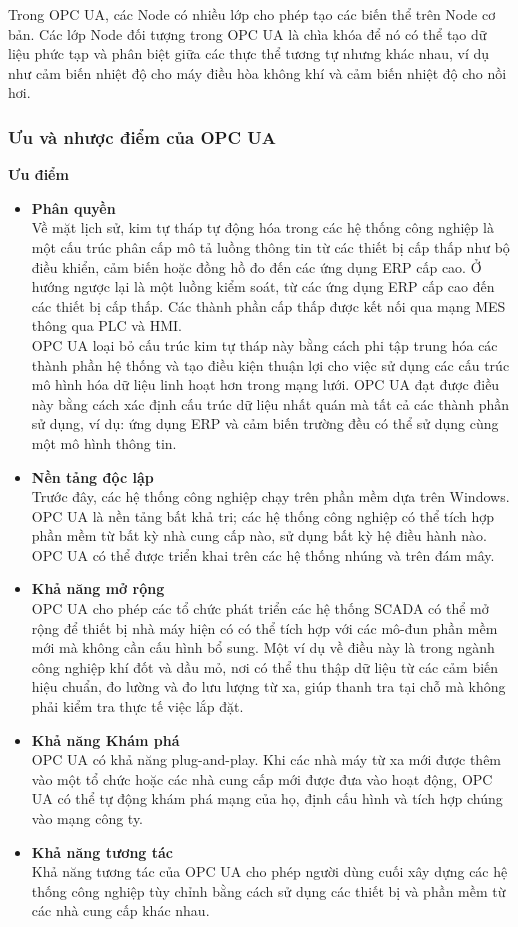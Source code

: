 Trong OPC UA, các Node có nhiều lớp cho phép tạo các biến thể trên Node cơ bản. Các lớp Node đối tượng trong OPC UA là chìa khóa để nó có thể tạo dữ liệu phức tạp và phân biệt giữa các thực thể tương tự nhưng khác nhau, ví dụ như cảm biến nhiệt độ cho máy điều hòa không khí và cảm biến nhiệt độ cho nồi hơi.

\subsubsection{Ưu và nhược điểm của OPC UA}

\textbf{Ưu điểm}

\begin{itemize}
    \item \textbf{Phân quyền}\\
    Về mặt lịch sử, kim tự tháp tự động hóa trong các hệ thống công nghiệp là một cấu trúc phân cấp mô tả luồng thông tin từ các thiết bị cấp thấp như bộ điều khiển, cảm biến hoặc đồng hồ đo đến các ứng dụng ERP cấp cao. Ở hướng ngược lại là một luồng kiểm soát, từ các ứng dụng ERP cấp cao đến các thiết bị cấp thấp. Các thành phần cấp thấp được kết nối qua mạng MES thông qua PLC và HMI.\\
    OPC UA loại bỏ cấu trúc kim tự tháp này bằng cách phi tập trung hóa các thành phần hệ thống và tạo điều kiện thuận lợi cho việc sử dụng các cấu trúc mô hình hóa dữ liệu linh hoạt hơn trong mạng lưới. OPC UA đạt được điều này bằng cách xác định cấu trúc dữ liệu nhất quán mà tất cả các thành phần sử dụng, ví dụ: ứng dụng ERP và cảm biến trường đều có thể sử dụng cùng một mô hình thông tin.
    \item \textbf{Nền tảng độc lập}\\
    Trước đây, các hệ thống công nghiệp chạy trên phần mềm dựa trên Windows. OPC UA là nền tảng bất khả tri; các hệ thống công nghiệp có thể tích hợp phần mềm từ bất kỳ nhà cung cấp nào, sử dụng bất kỳ hệ điều hành nào. OPC UA có thể được triển khai trên các hệ thống nhúng và trên đám mây.
    \item \textbf{Khả năng mở rộng}\\ 
    OPC UA cho phép các tổ chức phát triển các hệ thống SCADA có thể mở rộng để thiết bị nhà máy hiện có có thể tích hợp với các mô-đun phần mềm mới mà không cần cấu hình bổ sung. Một ví dụ về điều này là trong ngành công nghiệp khí đốt và dầu mỏ, nơi có thể thu thập dữ liệu từ các cảm biến hiệu chuẩn, đo lường và đo lưu lượng từ xa, giúp thanh tra tại chỗ mà không phải kiểm tra thực tế việc lắp đặt.
    \item \textbf{Khả năng Khám phá} \\
    OPC UA có khả năng plug-and-play. Khi các nhà máy từ xa mới được thêm vào một tổ chức hoặc các nhà cung cấp mới được đưa vào hoạt động, OPC UA có thể tự động khám phá mạng của họ, định cấu hình và tích hợp chúng vào mạng công ty.
    \item \textbf{Khả năng tương tác} \\ 
    Khả năng tương tác của OPC UA cho phép người dùng cuối xây dựng các hệ thống công nghiệp tùy chỉnh bằng cách sử dụng các thiết bị và phần mềm từ các nhà cung cấp khác nhau.
\end{itemize}

